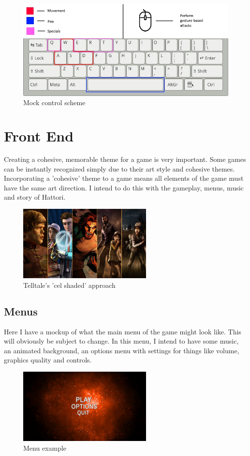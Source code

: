 \documentclass[a4paper]{scrreprt}
\begin{document}
\begin{figure}[h]
  \centering
  \includegraphics[width=1\textwidth]{Controls}
  \caption{Mock control scheme}
  \end{figure}




\chapter{Front End}
Creating a cohesive, memorable theme for a game is very important. Some games can be instantly recognized simply due to their art style and cohesive themes. Incorporating a 'cohesive' theme to a game means all elements of the game must have the same art direction. I intend to do this with the gameplay, menus, music and story of Hattori.
\begin{figure}[h]
  \centering
  \includegraphics[width=0.6\textwidth]{Telltale}
  \caption{Telltale's 'cel shaded' approach}
  \end{figure}
\section{Menus}
Here I have a mockup of what the main menu of the game might look like. This will obviously be subject to change.
In this menu, I intend to have some music, an animated background, an options menu with settings for things like volume, graphics quality and controls.
\begin{figure}[h]
  \centering
  \includegraphics[width=0.6\textwidth]{SampleMenu}
  \caption{Menu example}
  \end{figure}
\end{document}
